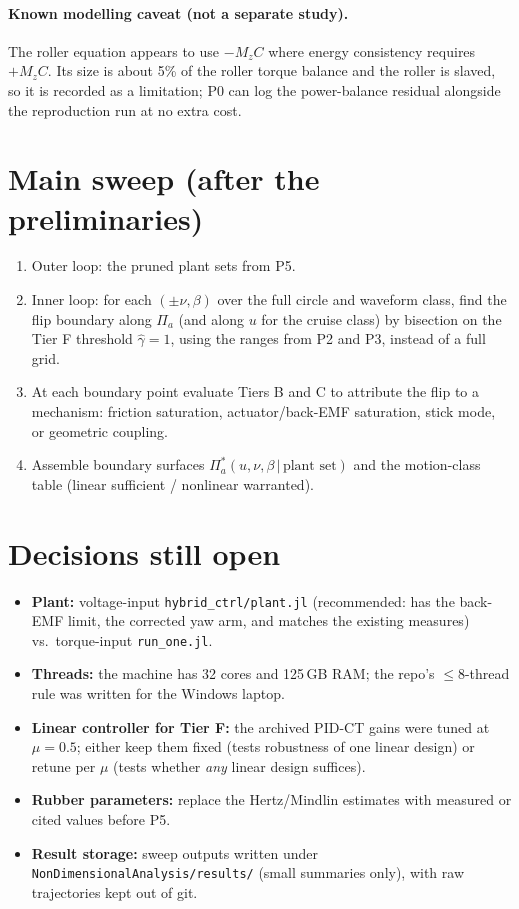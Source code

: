 \documentclass[11pt]{article}
\begin{document}
\paragraph{Known modelling caveat (not a separate study).} The roller equation
appears to use $-M_zC$ where energy consistency requires $+M_zC$. Its size is
about 5\% of the roller torque balance and the roller is slaved, so it is
recorded as a limitation; P0 can log the power-balance residual alongside the
reproduction run at no extra cost.

\section{Main sweep (after the preliminaries)}
\begin{enumerate}[leftmargin=*,itemsep=2pt]
  \item Outer loop: the pruned plant sets from P5.
  \item Inner loop: for each $(\pm\nu,\beta)$ over the full circle and waveform class, find the flip
    boundary along $\Pi_a$ (and along $u$ for the cruise class) by bisection on
    the Tier F threshold $\hat\gamma = 1$, using the ranges from P2 and P3, instead
    of a full grid.
  \item At each boundary point evaluate Tiers B and C to attribute the flip to a
    mechanism: friction saturation, actuator/back-EMF saturation, stick mode, or
    geometric coupling.
  \item Assemble boundary surfaces $\Pi_a^*(u,\nu,\beta\,|\,\text{plant set})$ and
    the motion-class table (linear sufficient / nonlinear warranted).
\end{enumerate}

\section{Decisions still open}
\begin{itemize}[itemsep=2pt]
  \item \textbf{Plant:} voltage-input \texttt{hybrid\_ctrl/plant.jl} (recommended:
    has the back-EMF limit, the corrected yaw arm, and matches the existing
    measures) vs.\ torque-input \texttt{run\_one.jl}.
  \item \textbf{Threads:} the machine has 32 cores and 125\,GB RAM; the repo's
    $\le 8$-thread rule was written for the Windows laptop.
  \item \textbf{Linear controller for Tier F:} the archived PID-CT gains were tuned
    at $\mu = 0.5$; either keep them fixed (tests robustness of one linear design)
    or retune per $\mu$ (tests whether \emph{any} linear design suffices).
  \item \textbf{Rubber parameters:} replace the Hertz/Mindlin estimates with
    measured or cited values before P5.
  \item \textbf{Result storage:} sweep outputs written under
    \texttt{NonDimensionalAnalysis/results/} (small summaries only), with raw
    trajectories kept out of git.
\end{itemize}
\end{document}

